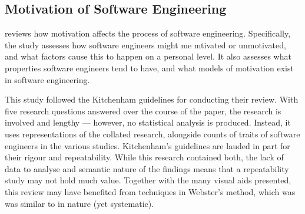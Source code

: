 \subsection{Motivation of Software Engineering} 
\citet*{Beecham2007} reviews how motivation affects the process of software engineering. Specifically, the study assesses how software engineers might me mtivated or unmotivated, and what factors cause this to happen on a personal level. It also assesses what properties software engineers tend to have, and what models of motivation exist in software engineering.\par

This study followed the Kitchenham guidelines for conducting their review. With five research questions answered over the course of the paper, the research is involved and lengthy --- however, no statistical analysis is produced. Instead, it uses representations of the collated research, alongside counts of traits of software engineers in the various studies. Kitchenham's guidelines are lauded in part for their rigour and repeatability. While this research contained both, the lack of data to analyse and semantic nature of the findings means that a repeatability study may not hold much value. Together with the many visual aids presented, this review may have benefited from techniques in Webster's method, which was was similar to in nature (yet systematic).\par
